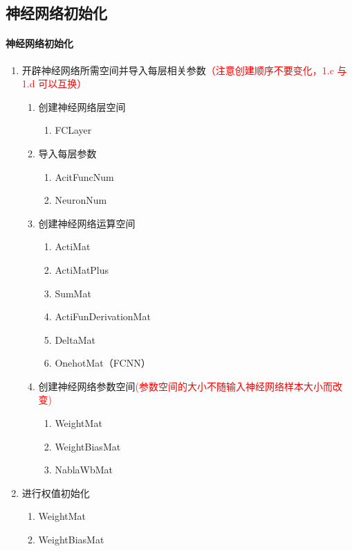 \documentclass[UTF-8]{progbookcn}
\begin{document}
\subsection{神经网络初始化}
\begin{keypoint}
\paragraph{神经网络初始化}
\begin{enumerate}
  \item 开辟神经网络所需空间并导入每层相关参数\textcolor{red}{（注意创建顺序不要变化，1.c 与1.d 可以互换）}
  \begin{enumerate}
    \item 创建神经网络层空间
    \begin{enumerate}
      \item FCLayer
    \end{enumerate}
        \item 导入每层参数
    \begin{enumerate}
      \item AcitFuncNum
      \item NeuronNum
    \end{enumerate}
    \item 创建神经网络运算空间
    \begin{enumerate}
      \item ActiMat
      \item ActiMatPlus
      \item SumMat
      \item ActiFunDerivationMat
      \item DeltaMat
      \item OnehotMat（FCNN）
    \end{enumerate}
    \item 创建神经网络参数空间\textcolor{red}{(参数空间的大小不随输入神经网络样本大小而改变)}
    \begin{enumerate}
      \item WeightMat
      \item WeightBiasMat
      \item NablaWbMat
    \end{enumerate}
  \end{enumerate}
  \item 进行权值初始化
  \begin{enumerate}
    \item WeightMat
    \item WeightBiasMat
  \end{enumerate}
\end{enumerate}
\end{keypoint}
\end{document}

